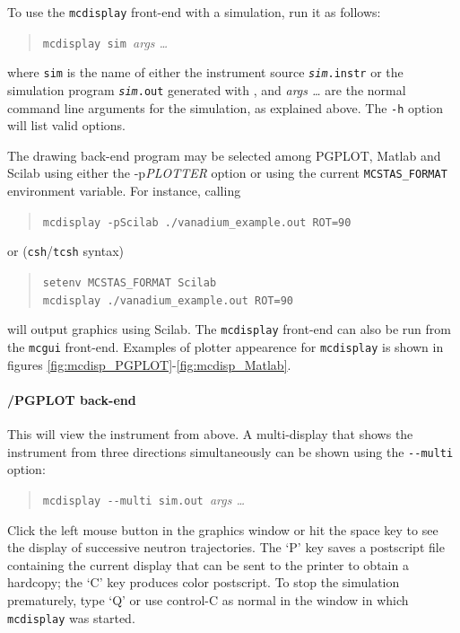 To use the \verb+mcdisplay+ front-end with a simulation, run it as
follows:
\begin{quote}
  \verb+mcdisplay sim +{\it args \ldots}
\end{quote}
where \verb+sim+ is the name of either the instrument source \texttt{{\it sim}.instr} or the simulation program \texttt{{\it sim}.out} generated with
\MCS, and \textit{args \ldots} are the normal command line arguments for
the simulation, as explained above. The \verb+-h+ option will list valid options.

The drawing back-end program may be selected among PGPLOT, Matlab and Scilab using either the -p{\it PLOTTER} option or using the current \verb+MCSTAS_FORMAT+ environment variable. 
For instance, calling 
\begin{quote}
  \verb+mcdisplay -pScilab ./vanadium_example.out ROT=90+
\end{quote}
or (\verb+csh+/\verb+tcsh+ syntax)
\begin{quote}
  \verb+setenv MCSTAS_FORMAT Scilab+\\ 
  \verb+mcdisplay ./vanadium_example.out ROT=90+
\end{quote}
will output graphics using Scilab. 
The \verb+mcdisplay+ front-end can also be run from the \verb+mcgui+ front-end.
Examples of plotter appearence for \verb+mcdisplay+ is shown in figures
 \ref{fig:mcdisp_PGPLOT}-\ref{fig:mcdisp_Matlab}.

\paragraph{\MCS /PGPLOT back-end}

This will view the instrument from above. A
multi-display that shows the instrument from three directions
simultaneously can be shown using the \verb+--multi+ option:
\begin{quote}
  \verb+mcdisplay --multi sim.out +{\it args \ldots}
\end{quote}

Click the left mouse button in the graphics window or hit the space key
to see the display of successive neutron trajectories. The `P' key saves
a postscript file containing the current display that can be sent to the
printer to obtain a hardcopy; the `C' key produces color postscript. 
To stop the simulation
prematurely, type `Q' or use control-C as normal in the window in which
\verb+mcdisplay+ was started.

